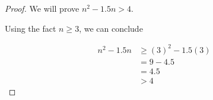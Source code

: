 \documentclass[12pt]{article}
\begin{document}
\begin{enumerate}[a.]
\begin{proof}
        \bigskip

        We will prove $n^2 - 1.5n > 4$.

        \bigskip

        Using the fact $n \geq 3$, we can conclude

        \setcounter{equation}{0}
        \begin{align}
            n^2 - 1.5n &\geq (3)^2 - 1.5(3)\\
            &= 9 - 4.5\\
            &= 4.5\\
            &> 4
        \end{align}
    \end{proof}

\end{enumerate}
\end{document}
